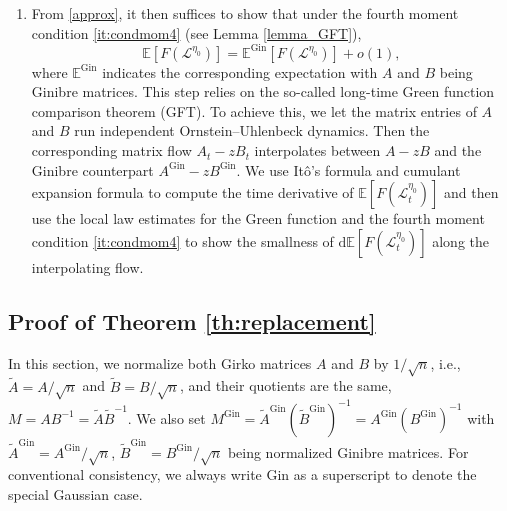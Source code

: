 \documentclass[10pt,reqno]{amsart}
\newcommand{\A}{{\tilde{A}}}
\newcommand{\B}{{\tilde{B}}}
\newcommand{\dd}{\mathrm{d}}
\newcommand{\ie}{i.e., }
\newcommand{\<}{\langle}
\renewcommand{\>}{\rangle}
\newcommand{\AG}{A^{\mathrm{Gin}}}
\newcommand{\BG}{B^{\mathrm{Gin}}}
\newcommand{\MG}{M^{\mathrm{Gin}}}
\numberwithin{equation}{section}
\begin{document}
\begin{enumerate}

    
    
	\item  From \eqref{approx},  it then suffices to show that under the fourth moment condition \ref{it:condmom4} (see Lemma \ref{lemma_GFT}), 
	$$\mathbb{E}[F(\mathcal{L}^{\eta_0})]=\mathbb{E}^{\mathrm{Gin}}[F(\mathcal{L}^{\eta_0})]+o(1),$$ 
	where $\mathbb{E}^{\mathrm{Gin}}$ indicates the corresponding expectation with $A$ and $B$ being Ginibre matrices. This step relies on the so-called long-time Green function comparison theorem (GFT). To achieve this, we let the matrix entries of $A$ and $B$ run independent Ornstein--Uhlenbeck dynamics. Then the corresponding matrix flow $A_t-zB_t$ interpolates between $A-zB$ and the Ginibre counterpart $A^{\mathrm{Gin}}-zB^{\mathrm{Gin}}$. We use Itô's formula and cumulant expansion formula to compute the time derivative of $\mathbb{E}[F(\mathcal{L}_t^{\eta_0})]$ and then use the local law estimates for the Green function 
    and the fourth moment condition \ref{it:condmom4} to show the smallness of $\dd\mathbb{E}[F(\mathcal{L}_t^{\eta_0})]$ along the interpolating flow. 
	
\end{enumerate}



\subsection{Proof of Theorem \ref{th:replacement}}
In this section, we normalize both Girko matrices $A$ and $B$ by $1/\sqrt{n}$, \ie $\A=A/\sqrt{n}$ and $\B=B/\sqrt{n}$, and their quotients are the same, $M=AB^{-1}=\A \B^{-1}$. We also set $\MG={\tilde A}^{\mathrm{Gin}}({\tilde B}^{\mathrm{Gin}})^{-1}=\AG (\BG)^{-1}$ with ${\tilde A}^{\mathrm{Gin}}=\AG/\sqrt{n}$, ${\tilde B}^{\mathrm{Gin}}=\BG/\sqrt{n}$ being normalized Ginibre matrices. For conventional consistency, we always write $\mathrm{Gin}$ as a superscript to denote the special Gaussian case. 
\end{document}
